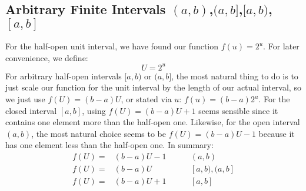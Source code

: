 \documentclass[12pt]{article}
\begin{document}



\subsection{Arbitrary Finite Intervals $(a,b)$,$(a,b]$,$[a,b)$,$[a,b]$}
For the half-open unit interval, we have found our function $f(u) = 2^u$. For later convenience, we define: 
\begin{equation}
	U = 2^u
\end{equation}
For arbitrary half-open intervals $[a,b)$ or $(a,b]$, the most natural thing to do is to just scale our function for the unit interval by the length of our actual interval, so we just use $f(U) = (b-a) U$, or stated via $u$: $f(u) = (b-a) 2^u$. For the closed interval $[a,b]$, using $f(U) = (b-a) U + 1$ seems sensible since it contains one element more than the half-open one. Likewise, for the open interval $(a,b)$, the most natural choice seems to be $f(U) = (b-a) U - 1$ because it has one element less than the half-open one. In summary:
\begin{eqnarray}
 f(U) =& (b-a) U - 1                 & \qquad (a,b) \\
 f(U) =& (b-a) U \quad \; \; \, \,   & \qquad [a,b),(a,b] \\
 f(U) =& (b-a) U + 1                 & \qquad [a,b]
\end{eqnarray}
\end{document}
